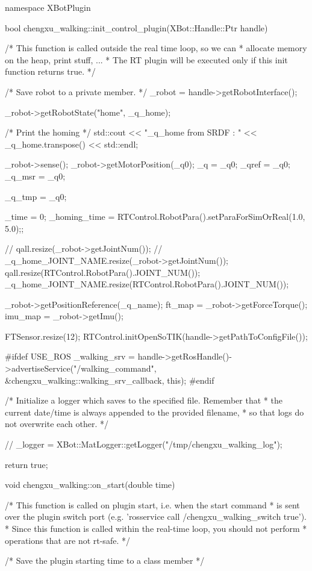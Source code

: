 namespace XBotPlugin {

bool chengxu_walking::init_control_plugin(XBot::Handle::Ptr handle)
{
	/* This function is called outside the real time loop, so we can
	 * allocate memory on the heap, print stuff, ...
	 * The RT plugin will be executed only if this init function returns true. */


	/* Save robot to a private member. */
	_robot = handle->getRobotInterface();

	_robot->getRobotState("home", _q_home);

	/* Print the homing */
	std::cout << "_q_home from SRDF : " << _q_home.transpose() << std::endl;

	_robot->sense();
	_robot->getMotorPosition(_q0);
	_q = _q0;
	_qref = _q0;
	_q_msr = _q0;

	_q_tmp = _q0;

	_time = 0;
	_homing_time = RTControl.RobotPara().setParaForSimOrReal(1.0, 5.0);;

	// qall.resize(_robot->getJointNum());
	// _q_home_JOINT_NAME.resize(_robot->getJointNum());
	qall.resize(RTControl.RobotPara().JOINT_NUM());
	_q_home_JOINT_NAME.resize(RTControl.RobotPara().JOINT_NUM());

	_robot->getPositionReference(_q_name);
	ft_map = _robot->getForceTorque();
	imu_map = _robot->getImu();

	FTSensor.resize(12);
	RTControl.initOpenSoTIK(handle->getPathToConfigFile());

#ifdef USE_ROS
	_walking_srv = handle->getRosHandle()->advertiseService("/walking_command", &chengxu_walking::walking_srv_callback, this);
#endif

	/* Initialize a logger which saves to the specified file. Remember that
	 * the current date/time is always appended to the provided filename,
	 * so that logs do not overwrite each other. */

// 	_logger = XBot::MatLogger::getLogger("/tmp/chengxu_walking_log");

	return true;


}

void chengxu_walking::on_start(double time)
{
	/* This function is called on plugin start, i.e. when the start command
	 * is sent over the plugin switch port (e.g. 'rosservice call /chengxu_walking_switch true').
	 * Since this function is called within the real-time loop, you should not perform
	 * operations that are not rt-safe. */

	/* Save the plugin starting time to a class member */

}}
